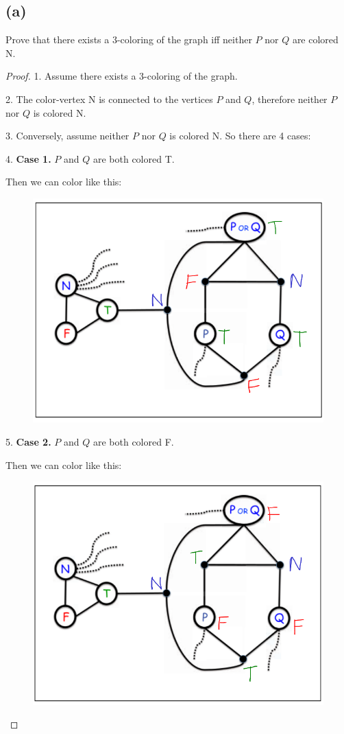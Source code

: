 \documentclass[14pt]{extarticle}
\begin{document}
\subsection{(a)}
Prove that there exists a 3-coloring of the graph iff neither $P$ nor $Q$ are colored N.
\begin{proof}
1. Assume there exists a 3-coloring of the graph.

2. The color-vertex N is connected to the vertices $P$ and $Q$, therefore neither $P$ nor $Q$ is colored N.

3. Conversely, assume neither $P$ nor $Q$ is colored N. So there are 4 cases:

4. {\bf Case 1.} $P$ and $Q$ are both colored T.

Then we can color like this:

\begin{figure}[ht!]
\centering
\includegraphics[scale=0.3]{3-color-1.png}
\end{figure}

5. {\bf Case 2.} $P$ and $Q$ are both colored F.

Then we can color like this:

\begin{figure}[ht!]
\centering
\includegraphics[scale=0.3]{3-color-2.png}
\end{figure}


\end{proof}
\end{document}
